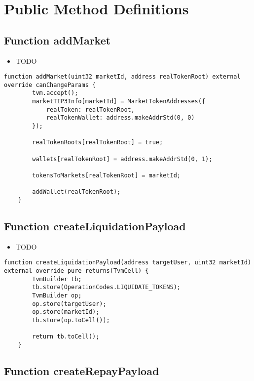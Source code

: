 \section{Public Method Definitions}


\subsection{Function addMarket}

\noindent\begin{itemize}
\item TODO
\end{itemize}

\begin{lstlisting}[firstnumber=123]
    function addMarket(uint32 marketId, address realTokenRoot) external override canChangeParams {
        tvm.accept();
        marketTIP3Info[marketId] = MarketTokenAddresses({
            realToken: realTokenRoot,
            realTokenWallet: address.makeAddrStd(0, 0)
        });

        realTokenRoots[realTokenRoot] = true;

        wallets[realTokenRoot] = address.makeAddrStd(0, 1);

        tokensToMarkets[realTokenRoot] = marketId;

        addWallet(realTokenRoot);
    }
\end{lstlisting}

\subsection{Function createLiquidationPayload}

\noindent\begin{itemize}
\item TODO
\end{itemize}

\begin{lstlisting}[firstnumber=345]
    function createLiquidationPayload(address targetUser, uint32 marketId) external override pure returns(TvmCell) {
        TvmBuilder tb;
        tb.store(OperationCodes.LIQUIDATE_TOKENS);
        TvmBuilder op;
        op.store(targetUser);
        op.store(marketId);
        tb.store(op.toCell());

        return tb.toCell();
    }
\end{lstlisting}

\subsection{Function createRepayPayload}

